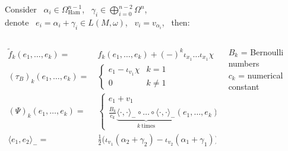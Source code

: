 \documentclass[beamer,10pt]{standalone}
\begin{document}
\begin{frame}


		\begin{propblock}
			\centering
			\parbox{0.96\linewidth}{%
				Consider ~$\alpha_i \in \Omega_{\text{Ham}}^{n-1}$,
				~$\gamma_i \in \bigoplus_{i=0}^{n-2}\Omega^n$,
				\\
				denote ~$e_i = \alpha_i + \gamma_i \in L(M,\omega)$, 
				~$v_i = v_{\alpha_i}$,  ~then:
			}
			\begin{columns}[T]
				\begin{column}{.8\linewidth}
					\begin{displaymath}
						\begin{split}
							\tilde{f}_k(e_1,\dots,e_k) =&~
							f_k(e_1,\dots,e_k)  + (-)^k \iota_{x_1}\dots\iota_{x_1} \chi
							\\
							(\tau_B)_k (e_1,\dots,e_k) =&~
							\begin{cases}
								e_1 - \iota_{v_1} \chi & k=1 \\
								0	& k \neq 1
							\end{cases}
							\\
							(\Psi)_k (e_1,\dots,e_k) =&~
							\begin{cases}
								e_1 + v_1 & k=1 \\
								\frac{B_k}{c_k} 
							\underbrace{\langle\cdot,\cdot\rangle_-\circ\dots\circ\langle\cdot,\cdot\rangle_-}_{k ~\text{times}}(e_1,\dots,e_k)	& k \neq 1
							\end{cases}
							\\
							\langle e_1,e_2 \rangle_- =&~
							\frac{1}{2}\big(\iota_{v_1}(\alpha_2+\gamma_2)
							- \iota_{v_2}(\alpha_1+\gamma_1)\big)							
						\end{split}
					\end{displaymath}
				\end{column}
				\begin{column}{.2\linewidth}
					\vspace{5em}
					\small
					$B_k$ = Bernoulli numbers \\
					$c_k$ = numerical constant
				\end{column}			
			\end{columns}		
		\end{propblock}



\end{frame}









\end{document}
